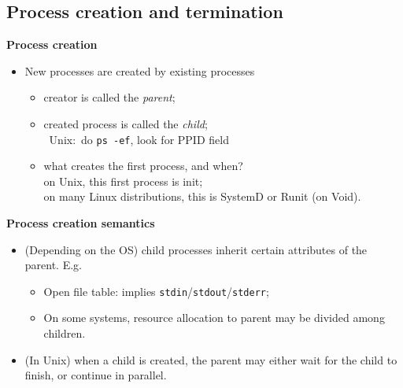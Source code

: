 \documentclass[11pt,a4paper]{article}
\begin{document}
\subsection{Process creation and termination}

\textbf{Process creation}
\begin{itemize}
    \item New processes are created by existing processes
        \begin{itemize}
            \item creator is called the \emph{parent};
            \item created process is called the \emph{child};\\\
                Unix:\ do \texttt{ps -ef}, look for PPID field
            \item what creates the first process, and when? \\
                on Unix, this first process is init; \\
                on many Linux distributions, this is SystemD or Runit (on Void).
        \end{itemize}
\end{itemize}

\textbf{Process creation semantics}
\begin{itemize}
    \item (Depending on the OS) child processes inherit certain attributes of the parent.
        E.g.
        \begin{itemize}
            \item Open file table: implies \texttt{stdin}/\texttt{stdout}/\texttt{stderr};
            \item On some systems, resource allocation to parent may be divided among children.
        \end{itemize}
    \item (In Unix) when a child is created, the parent may either wait for the child to
        finish, or continue in parallel.
\end{itemize}
\end{document}

